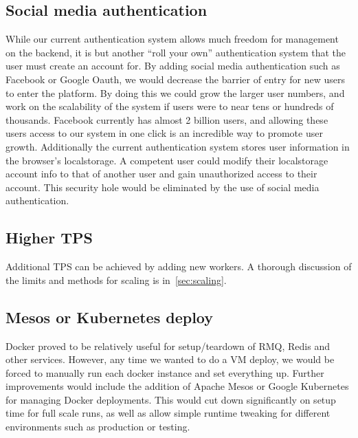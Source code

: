 \subsection{Social media authentication}
While our current authentication system allows much freedom for management on the backend, it is but another “roll your own” authentication system that the user must create an account for. By adding social media authentication such as Facebook or Google Oauth, we would decrease the barrier of entry for new users to enter the platform. By doing this we could grow the larger user numbers, and work on the scalability of the system if users were to near tens or hundreds of thousands. Facebook currently has almost 2 billion users, and allowing these users access to our system in one click is an incredible way to promote user growth.  Additionally the current authentication system stores user information in the browser’s localstorage.  A competent user could modify their localstorage account info to that of another user and gain unauthorized access to their account.  This security hole would be eliminated by the use of social media authentication.

\subsection{Higher TPS}
Additional TPS can be achieved by adding new workers. A thorough discussion of the limits and methods for scaling is in~\ref{sec:scaling}.

\subsection{Mesos or Kubernetes deploy}
Docker proved to be relatively useful for setup/teardown of RMQ, Redis and other services. However, any time we wanted to do a VM deploy, we would be forced to manually run each docker instance and set everything up. Further improvements would include the addition of Apache Mesos or Google Kubernetes for managing Docker deployments. This would cut down significantly on setup time for full scale runs, as well as allow simple runtime tweaking for different environments such as production or testing.
